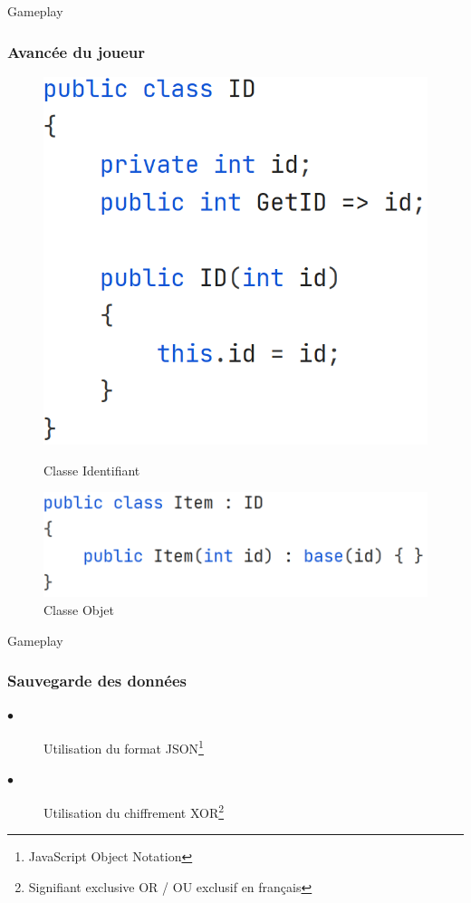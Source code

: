 \begin{frame}{Gameplay}
\frametitle{Avancée du joueur}
\begin{figure}[H]
\centering
\begin{minipage}{.5\textwidth}
  \centering
  \includegraphics[width=.7\linewidth]{img/gameplay/IDclass.PNG}
  
  \caption{Classe Identifiant}
  \label{fig:ID}
\end{minipage}%
\begin{minipage}{.5\textwidth}
  \centering
  \includegraphics[width=.9\linewidth]{img/gameplay/ITEMclass.PNG}
  \caption{Classe Objet}
  \label{fig:Item}
\end{minipage}
\end{figure}
\end{frame}


\begin{frame}{Gameplay}
\frametitle{Sauvegarde des données}
\begin{description}
  \item[$\bullet$] Utilisation du format JSON\footnote[1]{ JavaScript Object Notation}
  \item[$\bullet$] Utilisation du chiffrement XOR\footnote[2]{ Signifiant exclusive OR / OU exclusif en français}
\end{description}
\end{frame}



